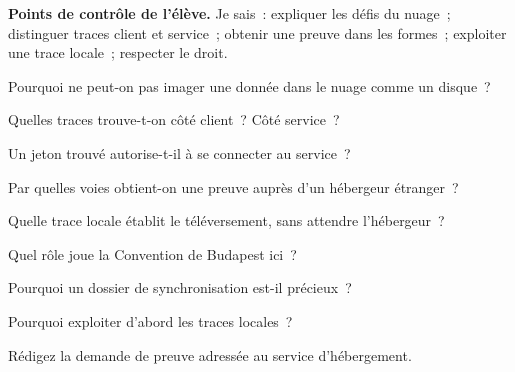 \begin{boxinfo}
\textbf{Points de contrôle de l'élève.} Je sais~: expliquer les défis du
nuage~; distinguer traces client et service~; obtenir une preuve dans les
formes~; exploiter une trace locale~; respecter le droit.
\end{boxinfo}

\bigskip

\begin{boxexo}[title={\ding{45}\quad Exercice~15.1. Défi \niveaubase}]
Pourquoi ne peut-on pas imager une donnée dans le nuage comme un disque~?
\end{boxexo}

\begin{boxexo}[title={\ding{45}\quad Exercice~15.2. Deux côtés \niveaubase}]
Quelles traces trouve-t-on côté client~? Côté service~?
\end{boxexo}

\begin{boxexo}[title={\ding{45}\quad Exercice~15.3. Jeton \niveaubase}]
Un jeton trouvé autorise-t-il à se connecter au service~?
\end{boxexo}

\begin{boxexo}[title={\ding{45}\quad Exercice~15.4. Dans les formes \niveaumoyen}]
Par quelles voies obtient-on une preuve auprès d'un hébergeur étranger~?
\end{boxexo}

\begin{boxexo}[title={\ding{45}\quad Exercice~15.5. TSANAGA \niveaumoyen}]
Quelle trace locale établit le téléversement, sans attendre l'hébergeur~?
\end{boxexo}

\begin{boxexo}[title={\ding{45}\quad Exercice~15.6. Budapest \niveaumoyen}]
Quel rôle joue la Convention de Budapest ici~?
\end{boxexo}

\begin{boxexo}[title={\ding{45}\quad Exercice~15.7. Synchronisation \niveaumoyen}]
Pourquoi un dossier de synchronisation est-il précieux~?
\end{boxexo}

\begin{boxexo}[title={\ding{45}\quad Exercice~15.8. Priorité \niveaumoyen}]
Pourquoi exploiter d'abord les traces locales~?
\end{boxexo}

\begin{boxexo}[title={\ding{45}\quad Exercice~15.9. Demande \niveauexpert}]
Rédigez la demande de preuve adressée au service d'hébergement.
\end{boxexo}

